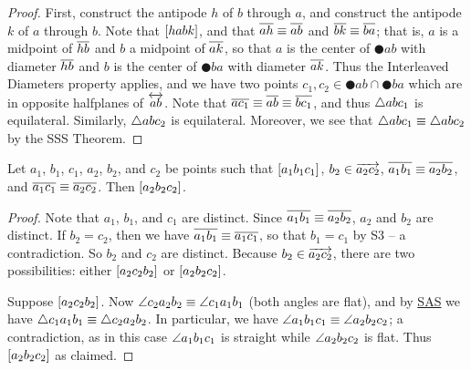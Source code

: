 \begin{proof}
First, construct the antipode \(h\) of \(b\) through \(a\), and construct the antipode \(k\) of \(a\) through \(b\).
Note that \([ habk ]\), and that \(\overline{ah} \equiv \overline{ab}\) and \(\overline{bk} \equiv \overline{ba}\); that is, \(a\) is a midpoint of \(\overline{hb}\) and \(b\) a midpoint of \(\overline{ak}\), so that \(a\) is the center of \(\CIRCLE{a}{b}\) with diameter \(\overline{hb}\) and \(b\) is the center of \(\CIRCLE{b}{a}\) with diameter \(\overline{ak}\).
Thus the Interleaved Diameters property applies, and we have two points \(c_1,c_2 \in \CIRCLE{a}{b} \cap \CIRCLE{b}{a}\) which are in opposite halfplanes of \(\overleftrightarrow{ab}\).
Note that \(\overline{ac_1} \equiv \overline{ab} \equiv \overline{bc_1}\), and thus \(\bigtriangleup{abc_1}\) is equilateral.
Similarly, \(\bigtriangleup{abc_2}\) is equilateral.
Moreover, we see that \(\bigtriangleup{abc_1} \equiv \bigtriangleup{abc_2}\) by the SSS Theorem.
\end{proof}

\begin{lem}\label{lem:betweenness-transfer}
Let \(a_1\), \(b_1\), \(c_1\), \(a_2\), \(b_2\), and \(c_2\) be points such that \([ a_1 b_1 c_1 ]\), \(b_2 \in \overrightarrow{a_2c_2}\), \(\overline{a_1b_1} \equiv \overline{a_2b_2}\), and \(\overline{a_1c_1} \equiv \overline{a_2c_2}\).
Then \([ a_2 b_2 c_2 ]\).
\end{lem}

\begin{proof}
Note that \(a_1\), \(b_1\), and \(c_1\) are distinct.
Since \(\overline{a_1b_1} \equiv \overline{a_2b_2}\), \(a_2\) and \(b_2\) are distinct.
If \(b_2 = c_2\), then we have \(\overline{a_1b_1} \equiv \overline{a_1c_1}\), so that \(b_1 = c_1\) by S3 -- a contradiction.
So \(b_2\) and \(c_2\) are distinct.
Because \(b_2 \in \overrightarrow{a_2c_2}\), there are two possibilities: either \([ a_2 c_2 b_2 ]\) or \([ a_2 b_2 c_2 ]\).

Suppose \([ a_2 c_2 b_2 ]\).
Now \(\angle{c_2a_2b_2} \equiv \angle{c_1a_1b_1}\) (both angles are flat), and by \hyperref[prop:sas-theorem]{SAS} we have \(\bigtriangleup{c_1a_1b_1} \equiv \bigtriangleup{c_2a_2b_2}\).
In particular, we have \(\angle{a_1b_1c_1} \equiv \angle{a_2b_2c_2}\); a contradiction, as in this case \(\angle{a_1b_1c_1}\) is straight while \(\angle{a_2b_2c_2}\) is flat.
Thus \([ a_2 b_2 c_2 ]\) as claimed.
\end{proof}


